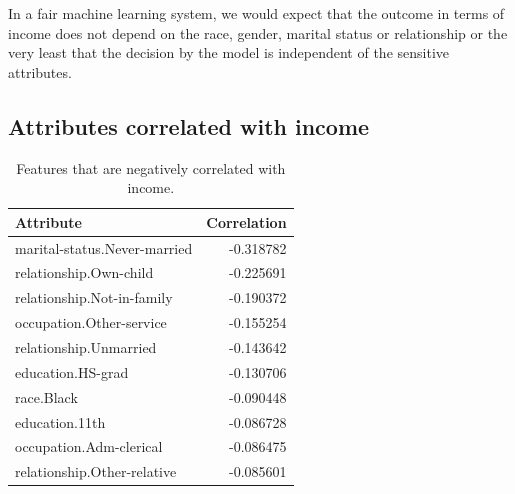 In a fair machine learning system, we would expect that the outcome in terms of income does not depend on the race, gender, marital status or relationship or the very least that the decision by the model is independent of the sensitive attributes.

\subsection{Attributes correlated with income}

\begin{table}
    \centering
    \begin{tabular}{lr}
        \toprule
        Attribute &  Correlation \\
        \midrule
        marital-status.Never-married &    -0.318782 \\
        relationship.Own-child       &    -0.225691 \\
        relationship.Not-in-family   &    -0.190372 \\
        occupation.Other-service     &    -0.155254 \\
        relationship.Unmarried       &    -0.143642 \\
        education.HS-grad            &    -0.130706 \\
        race.Black                   &    -0.090448 \\
        education.11th               &    -0.086728 \\
        occupation.Adm-clerical      &    -0.086475 \\
        relationship.Other-relative  &    -0.085601 \\
        \bottomrule
    \end{tabular}
    \caption{Features that are negatively correlated with income.}
    \label{fig:negative_income_correaltion}
\end{table}

